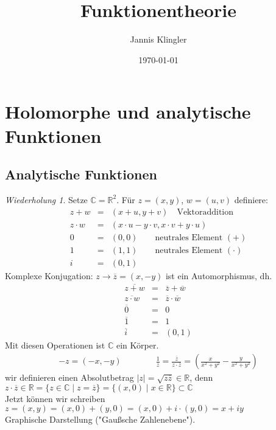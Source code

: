 \documentclass[11pt,titlepage]{article}
\title{Funktionentheorie}
\author{Jannis Klingler}
\date{\today}
\theoremstyle{definition}
\theoremstyle{remark}
\newtheorem*{repetition}{Wiederholung}
\begin{document}
	\maketitle
	
	\newpage
	\tableofcontents
	\newpage

	\section{Holomorphe und analytische Funktionen}

	\subsection{Analytische Funktionen}
	
	\begin{repetition}
		Setze $\mathbb{C}=\mathbb{R}^2$. Für $z=(x,y)$, $w=(u,v)$ definiere:
		\begin{eqnarray*}
			z+w&=&(x+u,y+v) \quad\text{Vektoraddition} \\
			z\cdot w&=&(x\cdot u-y\cdot v,x\cdot v+y\cdot u) \\
			0&=&(0,0) \qquad\text{neutrales Element $(+)$}\\
			1&=&(1,1) \qquad\text{neutrales Element $(\cdot )$}\\
			i&=&(0,1)
		\end{eqnarray*}
		Komplexe Konjugation: $z\to \overline{z} =(x,-y)$ ist ein Automorphismus, dh.
		\begin{eqnarray*}
			\overline{z+w} &=& \overline{z} +\overline{w} \\
			\overline{z\cdot w} &=& \overline{z} \cdot \overline{w} \\
			\overline{0} &=& 0\\
			\overline{1} &=& 1 \\
			\overline{i} &=& (0,1)
		\end{eqnarray*}
		Mit diesen Operationen ist $\mathbb{C}$ ein Körper.
		\begin{eqnarray*}
			-z=(-x,-y) \qquad \qquad \frac{1}{z}=\frac{\overline{z}}{z\cdot \overline{z}}=\left(
			\frac{x}{x^2 +y^2}-\frac{y}{x^2 +y^2} \right)
		\end{eqnarray*}
		wir definieren einen Absolutbetrag $|z| = \sqrt{z\overline{z}}\in \mathbb{R}$, denn 
		$z\cdot\overline{z} \in \mathbb{R} =\{ z\in \mathbb{C} \mid z=\overline{z} \} =
		\{ (x,0)\mid x\in\mathbb{R} \} \subset \mathbb{C}$ \\
		Jetzt können wir schreiben $z=(x,y)=(x,0)+(y,0)=(x,0)+i\cdot (y,0)=x+iy$ \\
		Graphische Darstellung ("Gaußsche Zahlenebene").
	\end{repetition}
	
\end{document}
